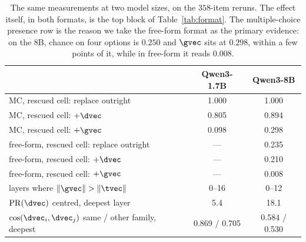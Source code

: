 \begin{table}[tbp]
\caption{The same measurements at two model sizes, on the $358$-item reruns.
The effect itself, in both formats, is the top block of Table~\ref{tab:format}.
The multiple-choice presence row is the reason we take the free-form format as
the primary evidence: on the 8B, chance on four options is $0.250$ and $\gvec$
sits at $0.298$, within a few points of it, while in free-form it reads
$0.008$.}
\label{tab:ladder}
\centering
\small
\begin{tabular}{lcc}
\toprule
\rowcolor{TableHeader}
 & Qwen3-1.7B & Qwen3-8B \\
\midrule
MC, rescued cell: replace outright        & 1.000 & 1.000 \\
MC, rescued cell: $+\dvec$                & 0.805 & 0.894 \\
MC, rescued cell: $+\gvec$                & 0.098 & 0.298 \\
free-form, rescued cell: replace outright & ---   & 0.235 \\
free-form, rescued cell: $+\dvec$         & ---   & 0.210 \\
free-form, rescued cell: $+\gvec$         & ---   & 0.008 \\
\midrule
layers where $\|\gvec\| > \|\tvec\|$      & 0--16 & 0--12 \\
$\mathrm{PR}(\dvec)$ centred, deepest layer & 5.4 & 18.1 \\
$\cos(\dvec_i,\dvec_j)$ same / other family, deepest & 0.869 / 0.705 & 0.584 / 0.530 \\
\bottomrule
\end{tabular}
\end{table}

\begin{table}[tbp]
\caption{The content component split along its own shared direction and
orthogonal to it, rescued cell, $n_R=82$. The crossover at layer 21 is the same
layer at which cumulative attention knockout on the document becomes free
(\S\ref{sec:where}) and at which another item's content vector stops working
(\S\ref{sec:whose}).}
\label{tab:parperp}
\centering
\small

\end{table}

